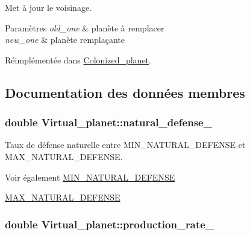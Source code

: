 Met à jour le voisinage. 


\begin{DoxyParams}{Paramètres}
{\em old\-\_\-one} & planète à remplacer \\
\hline
{\em new\-\_\-one} & planète remplaçante \\
\hline
\end{DoxyParams}


Réimplémentée dans \hyperlink{classColonized__planet_ac4f99490dc15c7715c1b476a490228a4}{Colonized\-\_\-planet}.



\subsection{Documentation des données membres}
\hypertarget{classVirtual__planet_af62ede97e609fd17818af229799dbe3b}{
\subsubsection[{natural\-\_\-defense\-\_\-}]{\setlength{\rightskip}{0pt plus 5cm}double Virtual\-\_\-planet\-::natural\-\_\-defense\-\_\-\hspace{0.3cm}{\ttfamily [protected]}}}\label{classVirtual__planet_af62ede97e609fd17818af229799dbe3b}


Taux de défense naturelle entre M\-I\-N\-\_\-\-N\-A\-T\-U\-R\-A\-L\-\_\-\-D\-E\-F\-E\-N\-S\-E et M\-A\-X\-\_\-\-N\-A\-T\-U\-R\-A\-L\-\_\-\-D\-E\-F\-E\-N\-S\-E. 

\begin{DoxySeeAlso}{Voir également}
\hyperlink{classVirtual__planet_ae0e71188803de0af557c7a1db8bd2d95}{M\-I\-N\-\_\-\-N\-A\-T\-U\-R\-A\-L\-\_\-\-D\-E\-F\-E\-N\-S\-E} 

\hyperlink{classVirtual__planet_ad5b8a23606fded6c444a93136fceab0a}{M\-A\-X\-\_\-\-N\-A\-T\-U\-R\-A\-L\-\_\-\-D\-E\-F\-E\-N\-S\-E} 
\end{DoxySeeAlso}
\hypertarget{classVirtual__planet_a6f8de6a5104185b9c36c64a45260fab6}{
\subsubsection[{production\-\_\-rate\-\_\-}]{\setlength{\rightskip}{0pt plus 5cm}double Virtual\-\_\-planet\-::production\-\_\-rate\-\_\-\hspace{0.3cm}{\ttfamily [protected]}}}\label{classVirtual__planet_a6f8de6a5104185b9c36c64a45260fab6}


